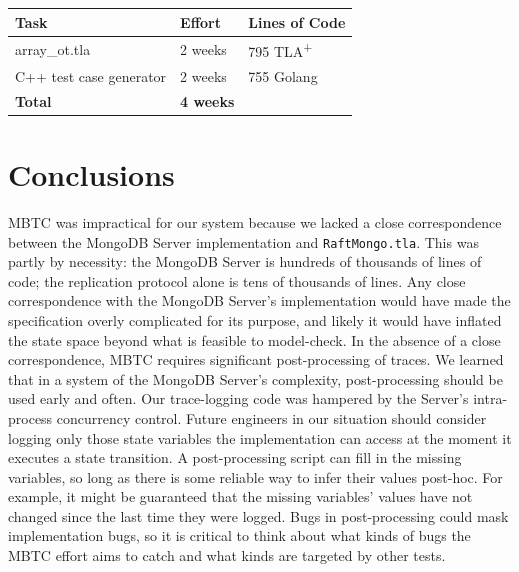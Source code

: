\documentclass{vldb}
\begin{document}

\begin{center}
\begin{tabular}{ | m{11em} | m{5em}| m{6em} | } 
\hline
Task & Effort & Lines of Code \\  
\hline
array\_ot.tla & 2 weeks & 795 TLA\textsuperscript{+} \\
C++ test case generator & 2 weeks & 755 Golang \\
\textbf{Total} & \textbf{4 weeks} & \\
\hline
\end{tabular}
\end{center}

\section{Conclusions}
\label{sec:conclusions}

MBTC was impractical for our system because we lacked a close correspondence between the MongoDB Server implementation and \texttt{RaftMongo.tla}.
This was partly by necessity: the MongoDB Server is hundreds of thousands of lines of code; the replication protocol alone is tens of thousands of lines.
Any close correspondence with the MongoDB Server's implementation would have made the specification overly complicated for its purpose, and likely it would have inflated the state space beyond what is feasible to model-check.
In the absence of a close correspondence, MBTC requires significant post-processing of traces. 
We learned that in a system of the MongoDB Server's complexity, post-processing should be used early and often.
Our trace-logging code was hampered by the Server's intra-process concurrency control.
Future engineers in our situation should consider logging only those state variables the implementation can access at the moment it executes a state transition.
A post-processing script can fill in the missing variables, so long as there is some reliable way to infer their values post-hoc.
For example, it might be guaranteed that the missing variables' values have not changed since the last time they were logged.
Bugs in post-processing could mask implementation bugs, so it is critical to think about what kinds of bugs the MBTC effort aims to catch and what kinds are targeted by other tests.
\end{document}
